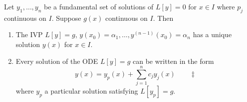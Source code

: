 \begin{theorem}\label{thm:inhomon}
    Let $y_1, \dots, y_n$ be a fundamental set of solutions of $L[y] = 0$ for $x \in I$ where $p_j$ continuous on $I$. Suppose $g(x)$ continuous on $I$. Then \begin{enumerate}
        \item The IVP $L[y] = g$, $y(x_0) = \alpha_1, \dots, y^{(n-1)}(x_0) = \alpha_n$ has a unique solution $y(x)$ for $x \in I$.
        \item Every solution of the ODE $L[y] = g$ can be written in the form \[
        y(x) = y_p(x) + \sum_{j=1}^n c_j y_j(x) \qquad \ddagger    
        \]
        where $y_p$ a particular solution satisfying $L[y_p] = g$.
    \end{enumerate}
\end{theorem}

